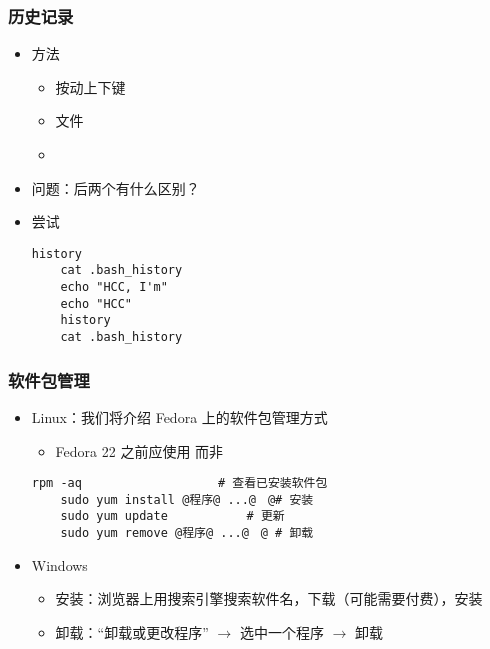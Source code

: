 \begin{frame} [fragile]
	\frametitle{历史记录}
	\linespread{1.25}
	\begin{itemize}
	\item 方法
		\begin{itemize}
		\item 按动上下键
		\item 文件 
		\item {}
		\end{itemize}
	\item 问题：后两个有什么区别？
	\item 尝试
	\begin{lstlisting}[style=bashstyle, gobble=4, texcl]
	history
	cat .bash_history
	echo "HCC, I'm"
	echo "HCC"
	history
	cat .bash_history
	\end{lstlisting}
	\end{itemize}
\end{frame}

\begin{frame} [fragile]
	\frametitle{软件包管理}
	\linespread{1.25}
	\begin{itemize}
	\item Linux：我们将介绍 Fedora 上的软件包管理方式
		\begin{itemize}
		\item Fedora 22 之前应使用  而非 
		\end{itemize}
	\begin{lstlisting}[style=bashstyle, gobble=4, texcl, escapechar=@]
	rpm -aq					  # 查看已安装软件包
	sudo yum install @程序@ ...@　@# 安装
	sudo yum update			  # 更新
	sudo yum remove @程序@ ...@　@ # 卸载
	\end{lstlisting}
	\item Windows
		\begin{itemize}
		\item 安装：浏览器上用搜索引擎搜索软件名，下载（可能需要付费），安装
		\item 卸载：``卸载或更改程序'' $\to$ 选中一个程序 $\to$ 卸载
		\end{itemize}
	\end{itemize}
\end{frame}

